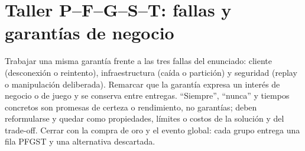 \documentclass[variant=docente,cover=institutional,mode=screen]{ua-engineering-v6-article}
\begin{document}
\section{Taller P--F--G--S--T: fallas y garantías de negocio}
Trabajar una misma garantía frente a las tres fallas del enunciado: cliente
(desconexión o reintento), infraestructura (caída o partición) y seguridad
(replay o manipulación deliberada). Remarcar que la garantía expresa un
interés de negocio o de juego y se conserva entre entregas. ``Siempre'',
``nunca'' y tiempos concretos son promesas de certeza o rendimiento, no
garantías; deben reformularse y quedar como propiedades, límites o costos de
la solución y del trade-off. Cerrar con la compra de oro y el evento global:
cada grupo entrega una fila PFGST y una alternativa descartada.
\end{document}
